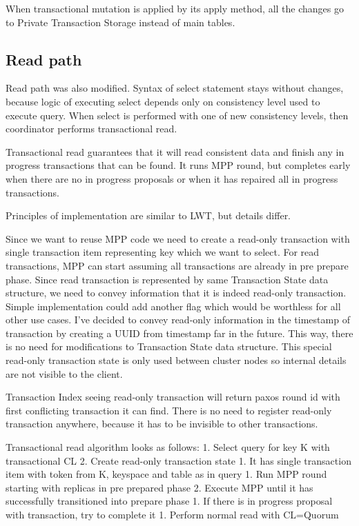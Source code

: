 When transactional mutation is applied by its apply method, all the changes go to Private Transaction Storage instead of main tables.


\subsection{Read path}
Read path \cite{CassandraReadPath} was also modified. Syntax of select statement stays without changes, because logic of executing select depends only on consistency level used to execute query.  When select is performed with one of new consistency levels, then coordinator performs transactional read.


Transactional read guarantees that it will read consistent data and finish any in progress transactions that can be found. It runs MPP round, but completes early when there are no in progress proposals or when it has repaired all in progress transactions.


Principles of implementation are similar to LWT, but details differ.


Since we want to reuse MPP code we need to create a read-only transaction with single transaction item representing key which we want to select. For read transactions, MPP can start assuming all transactions are already in pre prepare phase. Since read transaction is represented by same Transaction State data structure, we need to convey information that it is indeed read-only transaction. Simple implementation could add another flag which would be worthless for all other use cases. I’ve decided to convey read-only information in the timestamp of transaction by creating a UUID from timestamp far in the future. This way, there is no need for modifications to Transaction State data structure. This special read-only transaction state is only used between cluster nodes so internal details are not visible to the client.


Transaction Index seeing read-only transaction will return paxos round id with first conflicting transaction it can find. There is no need to register read-only transaction anywhere, because it has to be invisible to other transactions.


Transactional read algorithm looks as follows:
1. Select query for key K with transactional CL
2. Create read-only transaction state
   1. It has single transaction item with token from K, keyspace and table as in query
1. Run MPP round starting with replicas in pre prepared phase
2. Execute MPP until it has successfully transitioned into prepare phase
   1. If there is in progress proposal with transaction, try to complete it
1. Perform normal read with CL=Quorum


